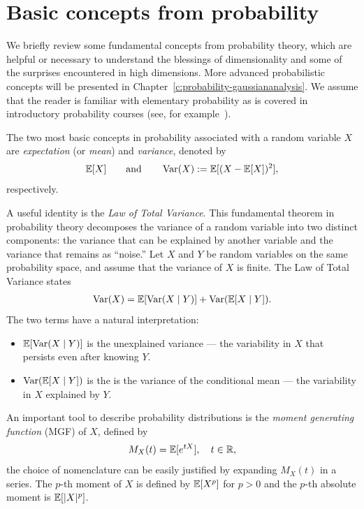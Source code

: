\section{Basic concepts from probability}

We briefly review some fundamental concepts from probability theory, which are helpful or necessary to understand the blessings of dimensionality and some of the surprises encountered in high dimensions. More advanced probabilistic concepts
will be presented in Chapter~\ref{c:probability-gaussiananalysis}.
We assume that the reader is familiar with elementary probability as is covered in introductory probability courses (see, for example~\cite{durrett2019probability,ross2014introduction}).

The two most basic concepts in probability associated with a random variable $X$ are {\em expectation} (or {\em mean}) and {\em variance}, denoted by
$$\mathbb{E}[X] \qquad \text{and} \qquad \operatorname{Var}(X) := \mathbb{E} [ (X- \mathbb{E} [X])^2 ],$$
respectively. 

A useful identity is the {\em Law of Total Variance}. This fundamental theorem in probability theory decomposes the variance of a random variable into two distinct components: the variance that can be explained by another variable and the variance that remains as ``noise.'' Let $X$ and $Y$ be random variables on the same probability space, and assume that the variance of $X$ is finite. The Law of Total Variance states
\begin{eqnarray}\label{eq:totalvariance}
\operatorname{Var}(X) = \mathbb{E}[\operatorname{Var}(X \mid Y)] + \operatorname{Var}(\mathbb{E}[X \mid Y]).\end{eqnarray}
The two terms have a natural interpretation:
\begin{itemize}
\item $\mathbb{E}[\operatorname{Var}(X \mid Y)]$ is the unexplained variance --- the variability in $X$ that
persists even after knowing $Y$.
\item
$\operatorname{Var}(\mathbb{E}[X \mid Y])$ is the is the variance of the conditional mean --- the variability in $X$ explained by $Y$. 
\end{itemize}




An important tool to describe probability distributions is the {\em moment generating function} (MGF) of $X$, defined by
\begin{equation}\label{eq:MomentGeneratingFunction}    
M_X(t) = \mathbb{E} [e^{tX}], \quad t\in \mathbb{R},
\end{equation}
the choice of nomenclature can be easily justified by expanding $M_X(t)$ in a series.
The $p$-th moment of $X$ is defined by $\mathbb{E}[X^p]$ for $p >0$ and the $p$-th absolute moment is $\mathbb{E}[|X|^p]$.

